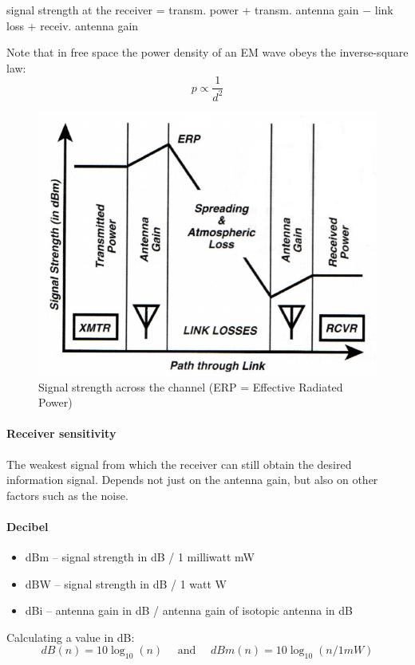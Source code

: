 signal strength at the receiver = transm. power + transm. antenna gain $-$ link loss + receiv. antenna gain

Note that in free space the power density of an EM wave obeys the inverse-square law:
$$ p \propto \frac{1}{d^2} $$

\begin{figure}
	\centering
	\includegraphics[scale=0.4]{images/1-signal-strength.png}
	\caption{Signal strength across the channel (ERP = Effective Radiated Power)}
	\label{fig:signal-strength}
\end{figure}

\paragraph{Receiver sensitivity}
The weakest signal from which the receiver can still obtain the desired information signal.
Depends not just on the antenna gain, but also on other factors such as the noise.

\paragraph{Decibel}
\begin{itemize}
	\item dBm -- signal strength in dB / 1 milliwatt mW
	\item dBW -- signal strength in dB / 1 watt W
	\item dBi -- antenna gain in dB / antenna gain of isotopic antenna in dB
\end{itemize}
Calculating a value in dB:
$$ dB(n) = 10 \log_{10} (n) \quad \text{ and } \quad dBm(n) = 10 \log_{10} (n / 1 mW) $$

